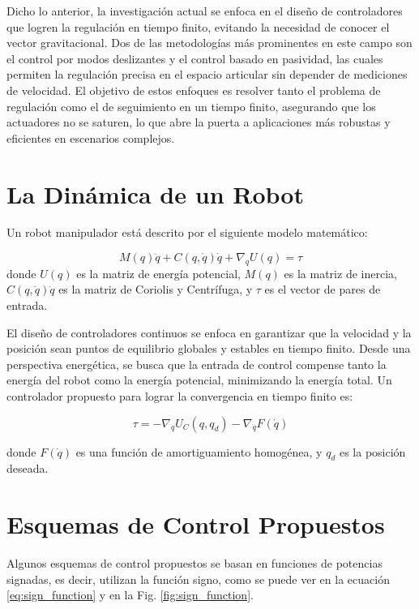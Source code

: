 \documentclass[conference]{IEEEtran}
\begin{document}
Dicho lo anterior, la investigación actual se enfoca en el diseño de controladores que logren la regulación en tiempo finito, evitando la necesidad de conocer el vector gravitacional. Dos de las metodologías más prominentes en este campo son el control por modos deslizantes y el control basado en pasividad, las cuales permiten la regulación precisa en el espacio articular sin depender de mediciones de velocidad. El objetivo de estos enfoques es resolver tanto el problema de regulación como el de seguimiento en un tiempo finito, asegurando que los actuadores no se saturen, lo que abre la puerta a aplicaciones más robustas y eficientes en escenarios complejos.


\section{La Dinámica de un Robot}
Un robot manipulador está descrito por el siguiente modelo matemático:

\begin{equation}
	M(q)\ddot{q} + C(q, \dot{q})\dot{q} + \nabla_q U(q) = \tau
\end{equation}
donde \( U(q) \) es la matriz de energía potencial, \( M(q) \) es la matriz de inercia, \( C(q, \dot{q})\dot{q} \) es la matriz de Coriolis y Centrífuga, y \( \tau \) es el vector de pares de entrada.

El diseño de controladores continuos se enfoca en garantizar que la velocidad y la posición sean puntos de equilibrio globales y estables en tiempo finito. Desde una perspectiva energética, se busca que la entrada de control compense tanto la energía del robot como la energía potencial, minimizando la energía total. Un controlador propuesto para lograr la convergencia en tiempo finito es:

\begin{equation}
	\tau = - \nabla_q U_C(q, q_d) - \nabla_{\dot{q}} F(\dot{q})
\end{equation}

donde \( F(\dot{q}) \) es una función de amortiguamiento homogénea, y \( q_d \) es la posición deseada.



\section{Esquemas de Control Propuestos}

Algunos esquemas de control propuestos se basan en funciones de potencias signadas, es decir, utilizan la función signo, como se puede ver en la ecuación \eqref{eq:sign_function} y en la Fig. \ref{fig:sign_function}.
\end{document}
